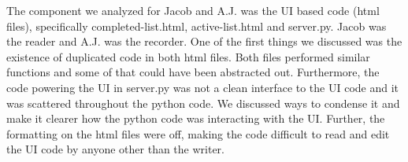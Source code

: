 \documentclass{article}
\begin{document}
The component we analyzed for Jacob and A.J. was the UI based code (html files), specifically completed-list.html, active-list.html and server.py. Jacob was the reader and A.J. was the recorder. One of the first things we discussed was the existence of duplicated code in both html files. Both files performed similar functions and some of that could have been abstracted out. Furthermore, the code powering the UI in server.py was not a clean interface to the UI code and it was scattered throughout the python code. We discussed ways to condense it and make it clearer how the python code was interacting with the UI. Further, the formatting on the html files were off, making the code difficult to read and edit the UI code by anyone other than the writer.
\end{document}

